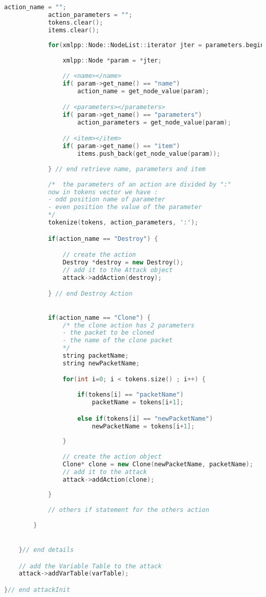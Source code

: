 \begin{lstlisting}[language={cpp}]
			action_name = "";
			action_parameters = "";
			tokens.clear();
			items.clear();
			
			for(xmlpp::Node::NodeList::iterator jter = parameters.begin(); jter != parameters.end(); ++jter) {
			  
				xmlpp::Node *param = *jter;
				
				// <name></name>
				if( param->get_name() == "name")
					action_name = get_node_value(param);

				// <parameters></parameters>
				if( param->get_name() == "parameters")
					action_parameters = get_node_value(param);

				// <item></item>
				if( param->get_name() == "item")
					items.push_back(get_node_value(param));
		
			} // end retrieve name, parameters and item
			
			/*  the parameters of an action are divided by ":"
			now in tokens vector we have :
			- odd position name of parameter
			- even position the value of the parameter
			*/	
			tokenize(tokens, action_parameters, ':');

			if(action_name == "Destroy") {

				// create the action
				Destroy *destroy = new Destroy();
				// add it to the Attack object 
				attack->addAction(destroy);  			

			} // end Destroy Action			

            
			if(action_name == "Clone") {
				/* the clone action has 2 parameters
				- the packet to be cloned
				- the name of the clone packet
				*/
				string packetName;
				string newPacketName;

				for(int i=0; i < tokens.size() ; i++) {
				
					if(tokens[i] == "packetName")
						packetName = tokens[i+1];

					else if(tokens[i] == "newPacketName")
						newPacketName = tokens[i+1];
					
				}
				
				// create the action object
				Clone* clone = new Clone(newPacketName, packetName);
				// add it to the attack
				attack->addAction(clone);
			
			}
			
			// others if statement for the others action 
			
		}


	}// end details

	// add the Variable Table to the attack
	attack->addVarTable(varTable);

}// end attackInit
\end{lstlisting}  


